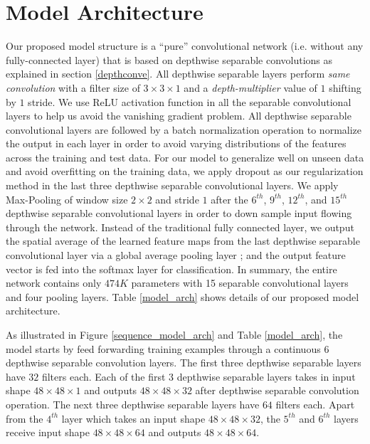 \documentclass[master]{thesis-uestc}
\begin{document}
\section{Model Architecture}
Our proposed model structure is a ``pure'' convolutional network (i.e. without any fully-connected layer) that is based on depthwise separable convolutions as explained in section \ref{depthconve}. All depthwise separable layers perform \textit{same convolution} with a filter size of $3 \times 3 \times 1$ and a \textit{depth-multiplier} value of $1$ shifting by $1$ stride. We use ReLU\cite{7410480} activation function in all the separable convolutional layers to help us avoid the vanishing gradient problem\cite{5264952}. All depthwise separable convolutional layers are followed by a batch normalization operation\cite{DBLP:journals/corr/IoffeS15} to normalize the output in each layer in order to avoid varying distributions of the features across the training and test data. For our model to generalize well on unseen data and avoid overfitting on the training data, we apply dropout\cite{JMLR:v15:srivastava14a} as our regularization method in the last three depthwise separable convolutional layers. We apply Max-Pooling of window size $2 \times 2$ and stride $1$ after the $6^{th}$, $9^{th}$, $12^{th}$, and $15^{th}$ depthwise separable convolutional layers in order to down sample input flowing through the network. Instead of the traditional fully connected layer, we output the spatial average of the learned feature maps from the last depthwise separable convolutional layer via a global average pooling layer \cite{DBLP:journals/corr/LinCY13}; and the output feature vector is fed into the softmax layer for classification.  In summary, the entire network contains only $474K$ parameters with 15 separable convolutional layers and four pooling layers. Table \ref{model_arch} shows details of our proposed model architecture.

As illustrated in Figure \ref{sequence_model_arch} and Table \ref{model_arch}, the model starts by feed forwarding training examples through a continuous $6$ depthwise separable convolution layers. The first three depthwise separable layers have $32$ filters each. Each of the first $3$ depthwise separable layers takes in input shape $48 \times 48 \times 1$ and outputs $48 \times 48 \times 32$ after depthwise separable convolution operation. The next three depthwise separable layers have $64$ filters each. Apart from the $4^{th}$ layer which takes an input shape $48 \times 48 \times 32$, the $5^{th}$ and $6^{th}$ layers receive input shape $48 \times 48 \times 64$ and outputs $48 \times 48 \times 64$.
\end{document}
